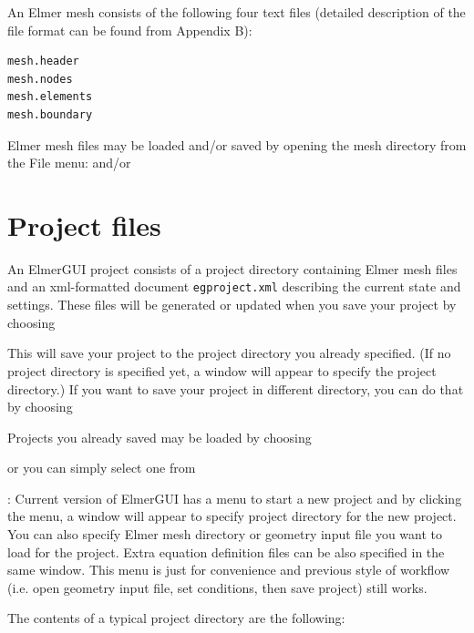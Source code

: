 An Elmer mesh consists of the following four text files (detailed description of the file
format can be found from Appendix B):

\begin{footnotesize}
\begin{verbatim}
mesh.header 
mesh.nodes 
mesh.elements 
mesh.boundary 
\end{verbatim}
\end{footnotesize}

Elmer mesh files may be loaded and/or saved by opening the mesh directory from the File menu:
\noindent and/or

\section{Project files}

An ElmerGUI project consists of a project directory containing Elmer mesh files and an xml-formatted 
document {\tt egproject.xml} describing the current state and settings. These files will be generated or updated when you save your project by choosing


This will save your project to the project directory you already specified. (If no project directory is specified yet, a window will appear to specify the project directory.) If you want to save your project in different directory, you can do that by choosing


\noindent Projects you already saved may be loaded by choosing


\noindent or you can simply select one from

\vspace{3mm}
: Current version of ElmerGUI has a menu to start a new project 
 \noindent and by clicking the menu, a window will appear to specify project directory for the new project. You can also specify Elmer mesh directory or geometry input file you want to load for the project. Extra equation definition files can be also specified in the same window. This menu is just for convenience and previous style of workflow (i.e. open geometry input file, set conditions, then save project) still works.

\vspace{3mm}
The contents of a typical project directory are the following:


